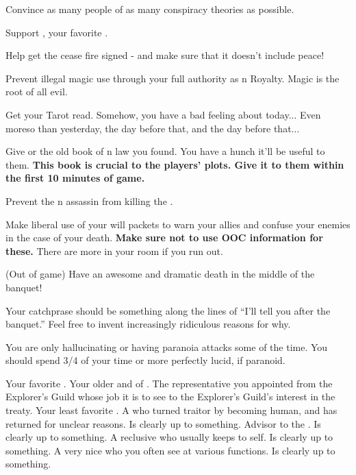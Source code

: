 \documentclass[char]{NeptuneBall}
\begin{document}
\begin{itemz}[Goals]
  \item Convince as many people of as many conspiracy theories as possible.
  \item Support \cPrincess{}, your favorite \cPrincess{\nephew}.
  \item Help \cKing{} get the cease fire signed - and make sure that it doesn't include peace!
	\item Prevent illegal magic use through your full authority as \pAtlantis{}n Royalty. Magic is the root of all evil.
	\item Get your Tarot read. Somehow, you have a bad feeling about today... Even moreso than yesterday, the day before that, and the day before that...
	\item Give \cPrincess{} or \cDiplomat{} the old book of \pPacifica{}n law you found. You have a hunch it'll be useful to them. {\bf This book is crucial to the players' plots. Give it to them within the first 10 minutes of game.}
	\item Prevent the \pPacifica{}n assassin from killing the \cKing{\King}.
	\item Make liberal use of your will packets to warn your allies and confuse your enemies in the case of your death. {\bf Make sure not to use OOC information for these.} There are more in your room if you run out.
	\item (Out of game) Have an awesome and dramatic death in the middle of the banquet!
\end{itemz}

\begin{itemz}[Notes]
  \item Your catchprase should be something along the lines of ``I'll tell you after the banquet.'' Feel free to invent increasingly ridiculous reasons for why.
  \item You are only hallucinating or having paranoia attacks some of the time. You should spend 3/4 of your time or more perfectly lucid, if paranoid.
\end{itemz}

\begin{contacts}
  \contact{\cPrincess{}} Your favorite \cPrincess{\nephew}.
  \contact{\cKing{}} Your older \cKing{\sibling} and \cKing{\King} of \pAtlantis{}.
  \contact{\cPriest{}} The representative you appointed from the Explorer's Guild whose job it is to see to the Explorer's Guild's interest in the treaty.
	\contact{\cAriel{}} Your least favorite \cAriel{\nephew}. A \cAriel{\mer} who turned traitor by becoming human, and has returned for unclear reasons. Is clearly up to something.
	\contact{\cManta{}} Advisor to the \cKing{\King}. Is clearly up to something.
	\contact{\cQueen{}} A reclusive \cQueen{\mer} who usually keeps to \cQueen{\their}self. Is clearly up to something.
	\contact{\cWitch{}} A very nice \cWitch{\mer} who you often see at various functions. Is clearly up to something.
\end{contacts}
\end{document}
